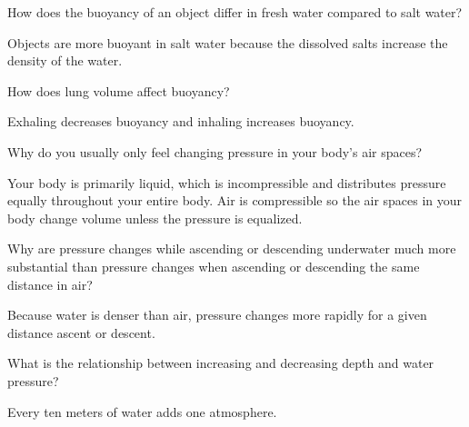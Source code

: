 	\begin{qanda}
		\begin{question}
How does the buoyancy of an object differ in fresh water compared to salt water?
		\end{question}

		\begin{answer}
Objects are more buoyant in salt water because the dissolved salts increase the density of the water.
		\end{answer}
	\end{qanda}

	\begin{qanda}
		\begin{question}
How does lung volume affect buoyancy?
		\end{question}

		\begin{answer}
Exhaling decreases buoyancy and inhaling increases buoyancy.
		\end{answer}
	\end{qanda}

	\begin{qanda}
		\begin{question}
Why do you usually only feel changing pressure in your body's air spaces?
		\end{question}

		\begin{answer}
Your body is primarily liquid, which is incompressible and distributes pressure equally throughout your entire body.  Air is compressible so the air spaces in your body change volume unless the pressure is equalized.
		\end{answer}
	\end{qanda}

	\begin{qanda}
		\begin{question}
Why are pressure changes while ascending or descending underwater much more substantial than pressure changes when ascending or descending the same distance in air?
		\end{question}

		\begin{answer}
Because water is denser than air, pressure changes more rapidly for a given distance ascent or descent.
		\end{answer}
	\end{qanda}

	\begin{qanda}
		\begin{question}
What is the relationship between increasing and decreasing depth and water pressure?
		\end{question}

		\begin{answer}
Every ten meters of water adds one atmosphere.
		\end{answer}
	\end{qanda}

